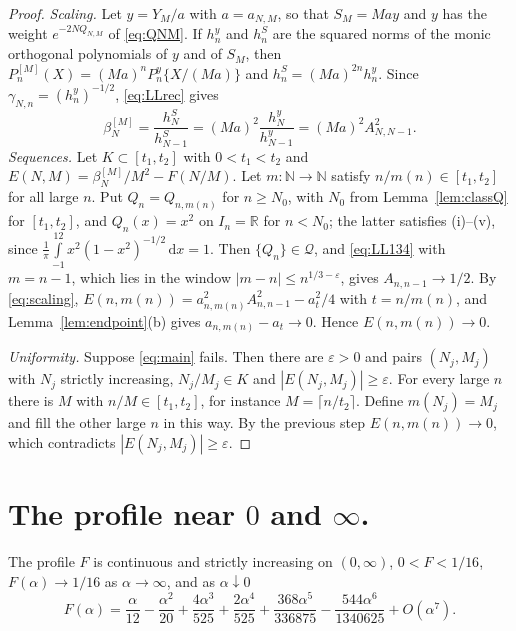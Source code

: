 \documentclass{math}
\let\TJMoriginalint\int
\renewcommand{\int}{\TJMoriginalint\limits}
\newcommand{\R}{\mathbb R}
\newcommand{\N}{\mathbb N}
\newcommand{\Qc}{\mathcal Q}
\newcommand{\dd}{\,\mathrm d}
\begin{document}
\begin{proof}
\emph{Scaling.} Let $y=Y_M/a$ with $a=a_{N,M}$, so that $S_M=May$ and $y$ has the weight $e^{-2NQ_{N,M}}$ of \eqref{eq:QNM}. If $h_n^{y}$ and $h_n^{S}$ are the squared norms of the monic orthogonal polynomials of $y$ and of $S_M$, then $P_n^{[M]}(X)=(Ma)^nP_n^{y}\{X/(Ma)\}$ and $h_n^{S}=(Ma)^{2n}h_n^{y}$. Since $\gamma_{N,n}=(h_n^{y})^{-1/2}$, \eqref{eq:LLrec} gives
\begin{equation}\label{eq:scaling}
\beta_N^{[M]}=\frac{h_N^{S}}{h_{N-1}^{S}}=(Ma)^2\frac{h_N^{y}}{h_{N-1}^{y}}=(Ma)^2A_{N,N-1}^2 .
\end{equation}
\emph{Sequences.} Let $K\subset[t_1,t_2]$ with $0<t_1<t_2$ and $E(N,M)=\beta_N^{[M]}/M^2-F(N/M)$. Let $m:\N\to\N$ satisfy $n/m(n)\in[t_1,t_2]$ for all large $n$. Put $Q_n=Q_{n,m(n)}$ for $n\ge N_0$, with $N_0$ from Lemma~\ref{lem:classQ} for $[t_1,t_2]$, and $Q_n(x)=x^2$ on $I_n=\R$ for $n<N_0$; the latter satisfies (i)--(v), since $\frac1\pi\int_{-1}^12x^2(1-x^2)^{-1/2}\dd x=1$. Then $\{Q_n\}\in\Qc$, and \eqref{eq:LL134} with $m=n-1$, which lies in the window $|m-n|\le n^{1/3-\varepsilon}$, gives $A_{n,n-1}\to1/2$. By \eqref{eq:scaling}, $E(n,m(n))=a_{n,m(n)}^2A_{n,n-1}^2-a_t^2/4$ with $t=n/m(n)$, and Lemma~\ref{lem:endpoint}(b) gives $a_{n,m(n)}-a_t\to0$. Hence $E(n,m(n))\to0$.

\emph{Uniformity.} Suppose \eqref{eq:main} fails. Then there are $\varepsilon>0$ and pairs $(N_j,M_j)$ with $N_j$ strictly increasing, $N_j/M_j\in K$ and $|E(N_j,M_j)|\ge\varepsilon$. For every large $n$ there is $M$ with $n/M\in[t_1,t_2]$, for instance $M=\lceil n/t_2\rceil$. Define $m(N_j)=M_j$ and fill the other large $n$ in this way. By the previous step $E(n,m(n))\to0$, which contradicts $|E(N_j,M_j)|\ge\varepsilon$.
\end{proof}

\section{The profile near $0$ and $\infty$.}\label{sec:cor}
\begin{corollary}\label{cor:F}
The profile $F$ is continuous and strictly increasing on $(0,\infty)$, $0<F<1/16$, $F(\alpha)\to1/16$ as $\alpha\to\infty$, and as $\alpha\downarrow0$
\begin{equation}\label{eq:Fseries}
F(\alpha)=\frac{\alpha}{12}-\frac{\alpha^2}{20}+\frac{4\alpha^3}{525}+\frac{2\alpha^4}{525}+\frac{368\alpha^5}{336875}-\frac{544\alpha^6}{1340625}+O(\alpha^7).
\end{equation}
\end{corollary}
\end{document}
